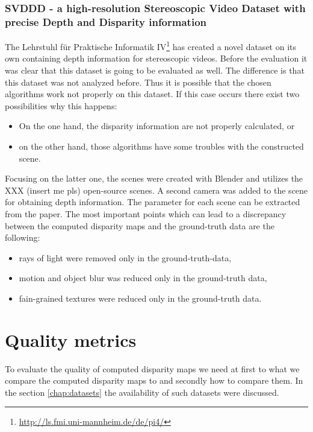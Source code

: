 \subsubsection{SVDDD - a high-resolution Stereoscopic Video Dataset with precise Depth and Disparity information}

The Lehrstuhl f{\"u}r Praktische Informatik IV\footnote{\url{http://ls.fmi.uni-mannheim.de/de/pi4/}} has created a novel dataset on its own containing depth information for stereoscopic videos.
Before the evaluation it was clear that this dataset is going to be evaluated as well.
The difference is that this dataset was not analyzed before.
Thus it is possible that the chosen algorithms work not properly on this dataset.
If this case occurs there exist two possibilities why this happens:

\begin{itemize}
  \item On the one hand, the disparity information are not properly calculated, or
  \item on the other hand, those algorithms have some troubles with the constructed scene.
\end{itemize}

\noindent Focusing on the latter one, the scenes were created with Blender and utilizes the XXX (insert me pls) open-source scenes.
A second camera was added to the scene for obtaining depth information.
The parameter for each scene can be extracted from the paper.
The most important points which can lead to a discrepancy between the computed disparity maps and the ground-truth data are the following:

\begin{itemize}
  \item rays of light were removed only in the ground-truth-data,
  \item motion and object blur was reduced only in the ground-truth data,
  \item fain-grained textures were reduced only in the ground-truth data.
\end{itemize}


\section{Quality metrics}

To evaluate the quality of computed disparity maps we need at first to what we compare the computed disparity maps to and secondly how to compare them. In the section \ref{chap:datasets} the availability of such datasets were discussed.

